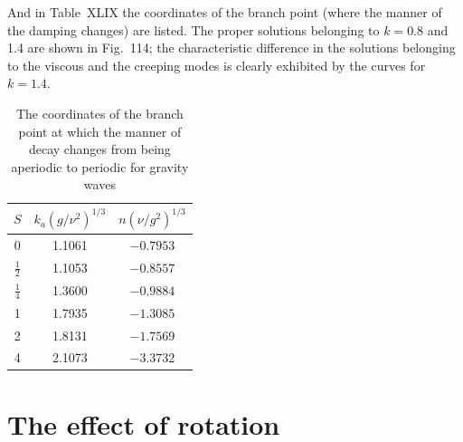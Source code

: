 And in Table~XLIX the coordinates of the branch point (where the manner of the damping changes) are listed. The proper solutions belonging to $k = 0.8$ and 1.4 are shown in Fig.~114; the characteristic difference in the solutions belonging to the viscous and the creeping modes is clearly exhibited by the curves for $k = 1.4$.

\begin{table}[ht]
\centering
\caption{The coordinates of the branch point at which the manner of decay changes from being aperiodic to periodic for gravity waves}
\label{tab:XLIX}
\small
\begin{tabular}{ccc}
\hline
$S$ & $k_a(g/\nu^2)^{1/3}$ & $n(\nu/g^2)^{1/3}$ \\
\hline
0 & 1.1061 & $-0.7953$ \\
$\frac{1}{2}$ & 1.1053 & $-0.8557$ \\
$\frac{1}{4}$ & 1.3600 & $-0.9884$ \\
1 & 1.7935 & $-1.3085$ \\
2 & 1.8131 & $-1.7569$ \\
4 & 2.1073 & $-3.3732$ \\
\hline
\end{tabular}
\end{table}


\section{The effect of rotation}\label{sec:95}

